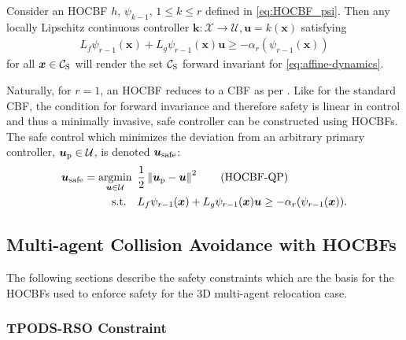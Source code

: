 \begin{theorem} Consider an HOCBF $h$, $\psi_{k-1}$, $1 \leq k \leq r$ defined in \eqref{eq:HOCBF_psi}. Then any locally Lipschitz continuous controller $\boldsymbol{k} : \mathcal{X} \rightarrow \mathcal{U}, \boldsymbol{u} = k(\boldsymbol{x})$ satisfying
\begin{align}
    L_f \psi_{r-1}(\boldsymbol{x}) + L_g \psi_{r-1} (\boldsymbol{x}) \boldsymbol{u} \geq -\alpha_r(\psi_{r-1}(\boldsymbol{x}))
\end{align}
for all $\boldsymbol{x} \in \mathcal{C}_{\rm S}$ will render the set $\mathcal{C}_{\rm S}$ forward invariant for \eqref{eq:affine-dynamics}.
\end{theorem}
Naturally, for $r = 1$, an HOCBF reduces to a CBF as per . Like for the standard CBF, the condition for forward invariance and therefore safety is linear in control and thus a minimally invasive, safe controller can be constructed using HOCBFs. The safe control which minimizes the deviation from an arbitrary primary controller, $\boldsymbol{u}_{\rm p} \in \mathcal{U}$, is denoted $\boldsymbol{u}_{\rm safe}$:
\begin{align} 
    \boldsymbol{u}_{\rm safe} = \underset{\boldsymbol{u} \in \mathcal{U}}{\text{argmin}} \mkern9mu & \frac{1}{2}\left\Vert \boldsymbol{u}_{\rm p}-\boldsymbol{u}\right\Vert^{2}
    \tag{HOCBF-QP} \label{eq:hocbf-qp} \\
    \text{s.t.} \quad & L_f \psi_{r-1}(\boldsymbol{x}) + L_g \psi_{r-1} (\boldsymbol{x}) \boldsymbol{u} \geq -\alpha_r(\psi_{r-1}(\boldsymbol{x})). \nonumber
\end{align}

\subsection{Multi-agent Collision Avoidance with HOCBFs}

The following sections describe the safety constraints which are the basis for the HOCBFs used to enforce safety for the 3D multi-agent relocation case.

\subsubsection{TPODS-RSO Constraint}


